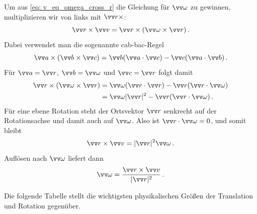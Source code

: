 Um aus \cref{eq: v_eq_omega_cross_r} die Gleichung für $\ivec{\omega}$ zu gewinnen, multiplizieren wir von links mit $\ivec{r} \times$:
\begin{equation}
    \ivec{r} \times \ivec{v} = \ivec{r} \times (\ivec{\omega} \times \ivec{r}) \mDot
\end{equation}
Dabei verwendet man die sogenannte cab-bac-Regel
\begin{equation}
    \ivec{a} \times (\ivec{b} \times \ivec{c}) = \ivec{b}(\ivec{a} \cdot \ivec{c}) - \ivec{c}(\ivec{a} \cdot \ivec{b}) \mDot
\end{equation}
Für $\ivec{a}=\ivec{r}$, $\ivec{b}=\ivec{\omega}$ und $\ivec{c}=\ivec{r}$ folgt damit
\begin{equation}\begin{aligned}
    \ivec{r} \times (\ivec{\omega} \times \ivec{r}) &= \ivec{\omega}(\ivec{r} \cdot \ivec{r}) - \ivec{r}(\ivec{r} \cdot \ivec{\omega}) \\
    &= \ivec{\omega} |\ivec{r}|^2 - \ivec{r}(\ivec{r} \cdot \ivec{\omega}) \mDot
\end{aligned}\end{equation}
Für eine ebene Rotation steht der Ortsvektor $\ivec{r}$ senkrecht auf der Rotationsachse und damit auch auf $\ivec{\omega}$. Also ist $\ivec{r} \cdot \ivec{\omega} = 0$, und somit bleibt
\begin{equation}
    \ivec{r} \times \ivec{v} = |\ivec{r}|^2\ivec{\omega} \mDot
\end{equation}
Auflösen nach $\ivec{\omega}$ liefert dann
\begin{equation}
    \ivec{\omega} = \frac{\ivec{r} \times \ivec{v}}{|\ivec{r}|^2} \mDot
\end{equation}


Die folgende Tabelle stellt die wichtigsten physikalischen Größen der Translation und Rotation gegenüber.

